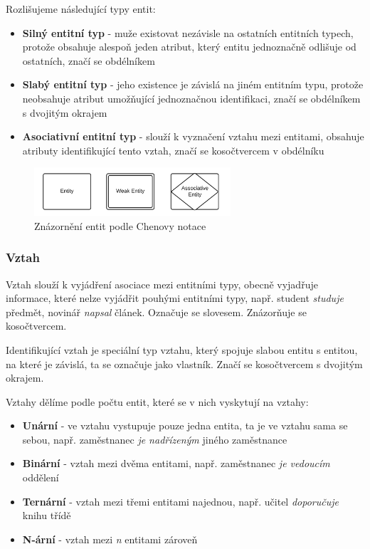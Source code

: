 \documentclass[czech,bachelor,public,dept460,male,oneside]{diploma}
\begin{document}
	Rozlišujeme následující typy entit:

	\begin{itemize}
		\item \textbf{Silný entitní typ} - muže existovat nezávisle na ostatních entitních typech, protože obsahuje alespoň jeden atribut, který entitu jednoznačně odlišuje od ostatních, značí se obdélníkem
		
		\item \textbf{Slabý entitní typ} - jeho existence je závislá na jiném entitním typu, protože neobsahuje atribut umožňující jednoznačnou identifikaci, značí se obdélníkem s dvojitým okrajem
		
		\item \textbf{Asociativní entitní typ} - slouží k vyznačení vztahu mezi entitami, obsahuje atributy identifikující tento vztah, značí se kosočtvercem v obdélníku
	\end{itemize}

	\begin{figure}[!h]
		\centering
		\includegraphics[width=0.65\textwidth]{Figures/ChenEntities}
		\caption[Znázornění entit podle Chenovy notace]{Znázornění entit podle Chenovy notace \cite{erdSymbols}}
	\end{figure}

	\subsubsection{Vztah}
	Vztah slouží k vyjádření asociace mezi entitními typy, obecně vyjadřuje informace, které nelze vyjádřit pouhými entitními typy, např. student \textit{studuje} předmět, novinář \textit{napsal} článek. Označuje se slovesem. Znázorňuje se kosočtvercem. 
	
	Identifikující vztah je speciální typ vztahu, který spojuje slabou entitu s entitou, na které je závislá, ta se označuje jako vlastník. Značí se kosočtvercem s dvojitým okrajem.
	
	Vztahy dělíme podle počtu entit, které se v nich vyskytují na vztahy:
	
	\begin{itemize}
		\item \textbf{Unární} - ve vztahu vystupuje pouze jedna entita, ta je ve vztahu sama se sebou, např. zaměstnanec \textit{je nadřízeným} jiného zaměstnance
		\item \textbf{Binární} - vztah mezi dvěma entitami, např. zaměstnanec \textit{je vedoucím} oddělení
		\item \textbf{Ternární} - vztah mezi třemi entitami najednou, např. učitel \textit{doporučuje} knihu třídě
		\item \textbf{N-ární} - vztah mezi \textit{n} entitami zároveň
	\end{itemize}
	
\end{document}
